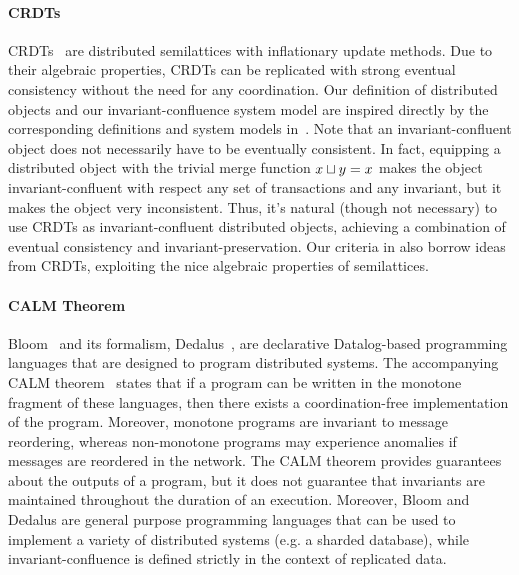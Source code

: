 \paragraph{CRDTs}
CRDTs~\cite{shapiro2011conflict, shapiro2011comprehensive} are distributed
semilattices with inflationary update methods. Due to their algebraic
properties, CRDTs can be replicated with strong eventual consistency without
the need for any coordination. Our definition of distributed objects and our
invariant-confluence system model are inspired directly by the corresponding
definitions and system models in~\cite{shapiro2011conflict}. Note that an
invariant-confluent object does not necessarily have to be eventually
consistent. In fact, equipping a distributed object with the trivial merge
function $x \sqcup y = x$ makes the object invariant-confluent with respect
any set of transactions and any invariant, but it makes the object very
inconsistent. Thus, it's natural (though not necessary) to use CRDTs as
invariant-confluent distributed objects, achieving a combination of eventual
consistency and invariant-preservation. Our criteria in
 also borrow ideas from CRDTs, exploiting the nice
algebraic properties of semilattices.

\paragraph{CALM Theorem}
Bloom~\cite{alvaro2010boom, alvaro2011consistency, conway2012logic} and its
formalism, Dedalus~\cite{alvaro2011dedalus, alvaro2013declarative}, are
declarative Datalog-based programming languages that are designed to program
distributed systems. The accompanying CALM
theorem~\cite{hellerstein2010declarative, ameloot2013relational} states that if
a program can be written in the monotone fragment of these languages, then
there exists a coordination-free implementation of the program. Moreover,
monotone programs are invariant to message reordering, whereas non-monotone
programs may experience anomalies if messages are reordered in the network. The
CALM theorem provides guarantees about the outputs of a program, but it does
not guarantee that invariants are maintained throughout the duration of an
execution. Moreover, Bloom and Dedalus are general purpose programming
languages that can be used to implement a variety of distributed systems (e.g.
a sharded database), while invariant-confluence is defined strictly in the
context of replicated data.

